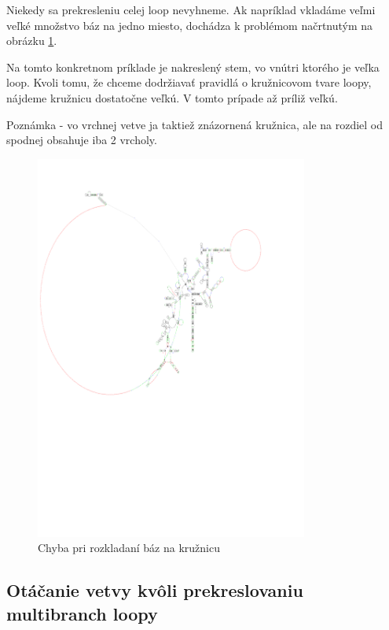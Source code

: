Niekedy sa prekresleniu celej loop nevyhneme. Ak napríklad vkladáme veľmi veľké množstvo báz na jedno
miesto, dochádza k problémom načrtnutým na obrázku \ref{obr:chyba_rozloženie_loopy}.

Na tomto konkretnom príklade je nakreslený stem, vo vnútri ktorého je veľka loop. Kvoli tomu,
že chceme dodržiavať pravidlá o kružnicovom tvare loopy, nájdeme kružnicu dostatočne veľkú.
V tomto prípade až príliž veľkú.

Poznámka - vo vrchnej vetve ja taktiež znázornená kružnica, ale na rozdiel od spodnej obsahuje iba 2 vrcholy.

\begin{figure}[H]
  \includegraphics[clip, trim=0 10cm 3cm 2cm,width=0.8\textwidth]{../img/chyby/african_frog-echinococcus_granulosus}
  \caption{Chyba pri rozkladaní báz na kružnicu}
  \label{obr:chyba_rozloženie_loopy}
\end{figure}

\subsection{Otáčanie vetvy kvôli prekreslovaniu multibranch loopy}

